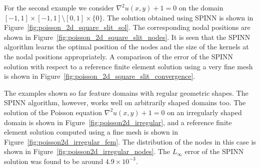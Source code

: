 \documentclass[12pt]{article}
\begin{document}
For the second example we consider $\nabla^2 u(x, y) + 1 = 0$ on the domain $[-1,1]\times[-1,1] \setminus [0,1]\times\{0\}$. The solution obtained using SPINN is shown in Figure~\ref{fig:poisson_2d_square_slit_sol}. The corresponding nodal positions are shown in Figure~\ref{fig:poisson_2d_square_slit_nodes}. It is seen that the SPINN algorithm learns the optimal position of the nodes and the size of the kernels at the nodal positions appropriately. A comparison of the error of the SPINN solution with respect to a reference finite element solution using a very fine mesh is shown in Figure~\ref{fig:poisson_2d_square_slit_convergence}.

The examples shown so far feature domains with regular geometric shapes. The SPINN algorithm, however, works well on arbitrarily shaped domains too. The solution of the Poisson equation $\nabla^2 u(x,y) + 1 = 0$ on an irregularly shaped domain is shown in Figure~\ref{fig:poisson2d_irregular}, and a reference finite element solution computed using a fine mesh is shown in Figure~\ref{fig:poisson2d_irregular_fem}. The distribution of the nodes in this case is shown in Figure~\ref{fig:poisson2d_irregular_nodes}.  The $L_{\infty}$ error of the SPINN solution was found to be around $4.9\times 10^{-3}$.
\end{document}

